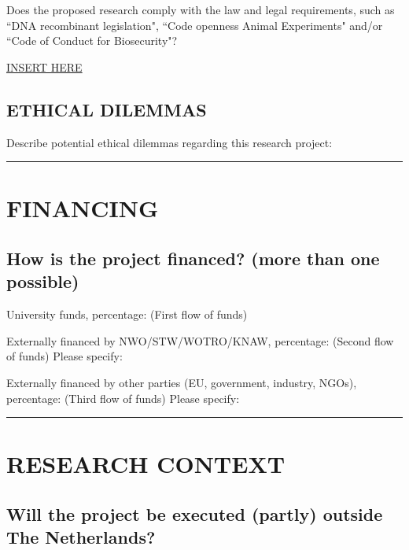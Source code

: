 \documentclass{article}
\begin{document}
Does the proposed research comply with the law and legal requirements, such as ``DNA recombinant legislation", ``Code openness Animal Experiments" and/or  ``Code of Conduct for Biosecurity"?

\underline{INSERT HERE}

\subsection{ETHICAL DILEMMAS}

Describe potential ethical dilemmas regarding this research project:


\begin{center}
    \rule{\textwidth}{0.5pt}
\end{center}

\section{FINANCING}

\subsection{How is the project financed? (more than one possible)}



{\Large \Square} University funds, percentage:
(First flow of funds)


{\Large \Square} Externally financed by NWO/STW/WOTRO/KNAW, percentage:
(Second flow of funds)
Please specify:

{\Large \Square} Externally financed by other parties (EU, government, industry, NGOs), percentage:
(Third flow of funds)
Please specify:


\begin{center}
    \rule{\textwidth}{0.5pt}
\end{center}

\section{RESEARCH CONTEXT}

\subsection{Will the project be executed (partly) outside The Netherlands?}
\end{document}
